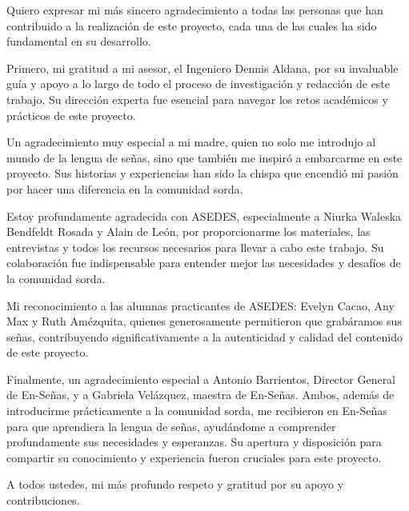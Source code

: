 Quiero expresar mi más sincero agradecimiento a todas las personas que han contribuido a la realización de este proyecto, cada una de las cuales ha sido fundamental en su desarrollo.

Primero, mi gratitud a mi asesor, el Ingeniero Dennis Aldana, por su invaluable guía y apoyo a lo largo de todo el proceso de investigación y redacción de este trabajo. Su dirección experta fue esencial para navegar los retos académicos y prácticos de este proyecto.

Un agradecimiento muy especial a mi madre, quien no solo me introdujo al mundo de la lengua de señas, sino que también me inspiró a embarcarme en este proyecto. Sus historias y experiencias han sido la chispa que encendió mi pasión por hacer una diferencia en la comunidad sorda.

Estoy profundamente agradecida con ASEDES, especialmente a Niurka Waleska Bendfeldt Rosada y Alain de León, por proporcionarme los materiales, las entrevistas y todos los recursos necesarios para llevar a cabo este trabajo. Su colaboración fue indispensable para entender mejor las necesidades y desafíos de la comunidad sorda.

Mi reconocimiento a las alumnas practicantes de ASEDES: Evelyn Cacao, Any Max y Ruth Amézquita, quienes generosamente permitieron que grabáramos sus señas, contribuyendo significativamente a la autenticidad y calidad del contenido de este proyecto.

Finalmente, un agradecimiento especial a Antonio Barrientos, Director General de En-Señas, y a Gabriela Velázquez, maestra de En-Señas. Ambos, además de introducirme prácticamente a la comunidad sorda, me recibieron en En-Señas para que aprendiera la lengua de señas, ayudándome a comprender profundamente sus necesidades y esperanzas. Su apertura y disposición para compartir su conocimiento y experiencia fueron cruciales para este proyecto.

A todos ustedes, mi más profundo respeto y gratitud por su apoyo y contribuciones.